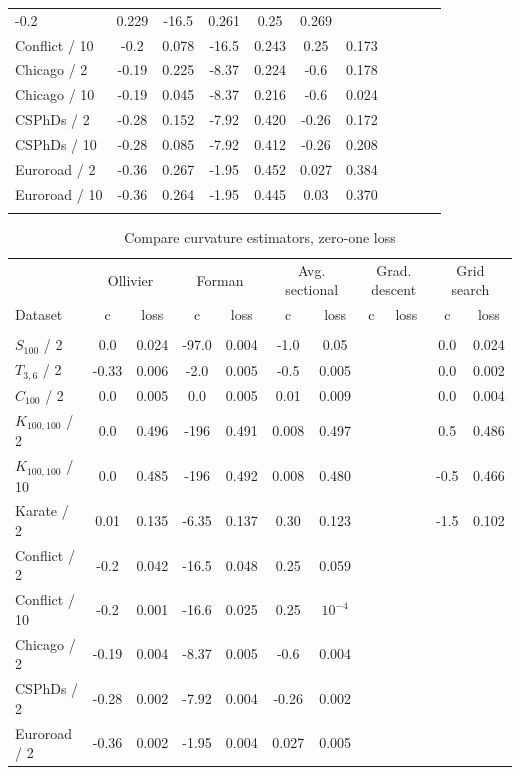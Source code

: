 \documentclass{article} %
\begin{document}
\begin{table}[t]
\begin{center}
\begin{tabular}{lcccccccccc}
-0.2 &	0.229 &
-16.5 &	0.261 &
0.25 & 	0.269 &
&&& \\
Conflict / 10 &
-0.2 & 0.078 &
-16.5 &	0.243 &
0.25 &	0.173 &
&&& \\
Chicago / 2 &
-0.19 & 0.225 & 
-8.37 & 0.224 & 
-0.6 & 0.178 & 
&&& \\
Chicago / 10 &
-0.19 & 0.045 & 
-8.37 & 0.216 & 
-0.6 & 0.024 & 
&&& \\
CSPhDs / 2 &
-0.28 &	0.152 &
-7.92 &	0.420 &
-0.26 & 0.172 &
&&& \\
CSPhDs / 10 &
-0.28 &	0.085 &
-7.92 &	0.412 &
-0.26 & 0.208 &
&&& \\
Euroroad / 2 &
-0.36 &	0.267 &
-1.95 &	0.452&
0.027 &	0.384&
&&& \\
Euroroad / 10 &
-0.36 &	0.264 &
-1.95 &	0.445 &
0.03 &	0.370 &
&&& \\
\hline \\
\end{tabular}
\end{center}
\end{table}

\begin{table}[t]
\caption{Compare curvature estimators, zero-one loss}
\label{tab:compare_zero_one}
\begin{center}
\begin{tabular}{lcccccccccc}
&
\multicolumn{2}{c}{Ollivier} &
\multicolumn{2}{c}{Forman} &
\multicolumn{2}{c}{Avg. sectional} &
\multicolumn{2}{c}{Grad. descent} &
\multicolumn{2}{c}{Grid search} \\
Dataset & c & loss  & c & loss  & c & loss & c & loss  & c & loss \\
\hline \\
$S_{100}$ / 2 &
0.0 & 0.024 & 
-97.0 & 0.004 & 
-1.0 & 0.05 &
&&
0.0 & 0.024
\\
$T_{3,6}$ / 2 &
-0.33 & 0.006 & 
-2.0 & 0.005 & 
-0.5 & 0.005 & 
&&
0.0 & 0.002 \\
$C_{100}$ / 2 & 
0.0 & 0.005 & 
0.0 & 0.005 &
0.01 & 0.009 & 
&&
0.0 & 0.004 \\
$K_{100,100}$ / 2 &
0.0 & 0.496 & 
-196 & 0.491 & 
0.008 & 0.497 & 
&&
0.5 & 0.486 \\
$K_{100,100}$ / 10 &
0.0 & 0.485 & 
-196 & 0.492 & 
0.008 & 0.480 & 
&&
-0.5 & 0.466 \\
Karate / 2 &
0.01 & 0.135 & 
-6.35 & 0.137 &
0.30 & 0.123 &
&&
-1.5 & 0.102\\
Conflict / 2 &
-0.2 & 0.042 &
-16.5 &	0.048 &
0.25 & 0.059 &
&&& \\
Conflict / 10 &
-0.2 & 0.001 &
-16.6 &	0.025 &
0.25 & $10^{-4}$
&&& \\
Chicago / 2 &
-0.19 & 0.004 & 
-8.37 & 0.005 & 
-0.6 & 0.004 & 
&&& \\
CSPhDs / 2 &
-0.28 &	0.002 &
-7.92 &	0.004 &
-0.26 & 0.002 &
&&& \\
Euroroad / 2 &
-0.36 &	0.002 &
-1.95 &	0.004 &
0.027 &	0.005 &
&&& \\
\end{tabular}
\end{center}
\end{table}
\end{document}
